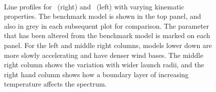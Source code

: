 \documentclass[preprint, a4paper, 11pt]{aastex}
\begin{document}
\begin{figure} %
\mbox{
\quad
{}   
}
\caption{
Line profiles for \ha\ (right) and \hb\ (left) with varying kinematic 
properties. The benchmark model is shown in the top panel, and also in grey in each 
subsequent plot for comparison. The parameter that has been altered from the benchmark model 
is marked on each panel. For the left and middle right columns, models lower down
are more slowly accelerating and have denser wind bases. The middle right column
shows the variation with wider launch radii, and the right hand column shows 
how a boundary layer of increasing temperature affects the spectrum.
}
\label{halpha}
\end{figure} %
\end{document}
